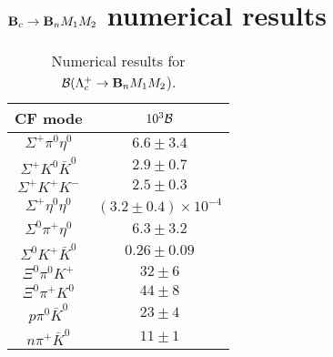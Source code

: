 \clearpage
\chapter{${\bf B}_c\to {\bf B}_nM_1M_2$ numerical  results}
\begin{table}[h]
	\centering
	\caption{Numerical results for 
		${\cal B}(\Lambda_{c}^{+} \to {\bf B}_nM_1M_2$).}\label{pre_Lc}
	{\scriptsize
		\begin{tabular}{|c|c|}
			\hline
			CF mode  & $10^{3}{\cal B}$\\
			\hline
			$\Sigma^{+} \pi^{0} \eta^{0} $ & $     6.6 \pm     3.4 $ \\
			$\Sigma^{+} K^{0} \bar{K}^{0} $ & $     2.9 \pm     0.7 $ \\
			$\Sigma^{+} K^{+} K^{-} $ & $     2.5 \pm     0.3 $ \\
			$ \Sigma^{+} \eta^{0} \eta^{0} $ & $    ( 3.2 \pm     0.4)\times10^{-4} $ \\
			$\Sigma^{0} \pi^{+} \eta^{0} $ & $     6.3 \pm     3.2 $ \\
			$ \Sigma^{0} K^{+} \bar{K}^{0} $ & $    0.26 \pm     0.09 $ \\
			$ \Xi^{0} \pi^{0} K^{+} $ & $     32 \pm     6 $ \\
			$ \Xi^{0} \pi^{+} K^{0} $ & $     44 \pm     8 $ \\
			$ p \pi^{0} \bar{K}^{0} $ & $     23 \pm     4 $ \\
			$ n \pi^{+} \bar{K}^{0} $ & $     11 \pm     1 $ \\
			

\end{tabular}}
\end{table}
